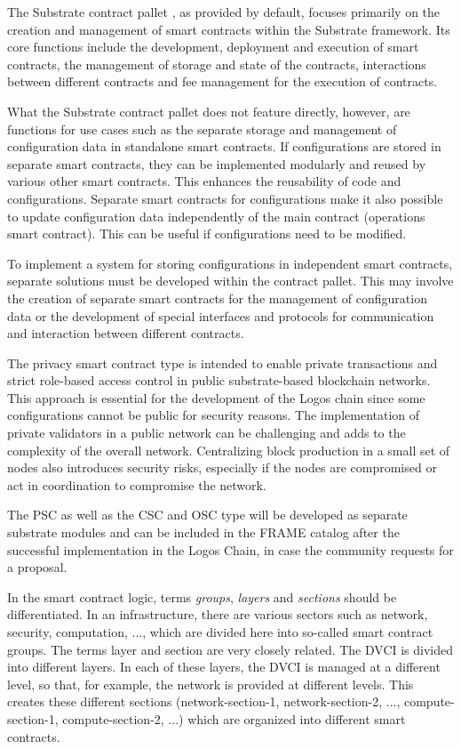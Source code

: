 \documentclass[]{article}
\begin{document}
The Substrate contract pallet \cite{Parity-docs-npos}, as provided by default, focuses primarily on the creation and management of smart contracts within the Substrate framework. 
Its core functions include the development, deployment and execution of smart contracts, the management of storage and state of the contracts, interactions between different contracts and fee management for the execution of contracts. 

What the Substrate contract pallet does not feature directly, however, are functions for use cases such as the separate storage and management of configuration data in standalone smart contracts.
If configurations are stored in separate smart contracts, they can be implemented modularly and reused by various other smart contracts. This enhances the reusability of code and configurations.
Separate smart contracts for configurations make it also possible to update configuration data independently of the main contract (operations smart contract). 
This can be useful if configurations need to be modified.

To implement a system for storing configurations in independent smart contracts, separate solutions must be developed within the contract pallet. 
This may involve the creation of separate smart contracts for the management of configuration data or the development of special interfaces and protocols for communication and interaction between different contracts.

The privacy smart contract type is intended to enable private transactions and strict role-based access control in public substrate-based blockchain networks.
This approach is essential for the development of the Logos chain since some configurations cannot be public for security reasons.
The implementation of private validators in a public network can be challenging and adds to the complexity of the overall network.
Centralizing block production in a small set of nodes also introduces security risks, especially if the nodes are compromised or act in coordination to compromise the network.

The PSC as well as the CSC and OSC type will be developed as separate substrate modules and can be included in the FRAME catalog after the successful implementation in the Logos Chain, in case the community requests for a proposal.  

In the smart contract logic, terms \textit{groups}, \textit{layers} and \textit{sections} should be differentiated.
In an infrastructure, there are various sectors such as network, security, computation, ..., which are divided here into so-called smart contract groups.
The terms layer and section are very closely related. 
The DVCI is divided into different layers. 
In each of these layers, the DVCI is managed at a different level, so that, for example, the network is provided at different levels.
This creates these different sections (network-section-1, network-section-2, ..., compute-section-1, compute-section-2, ...) which are organized into different smart contracts.
\end{document}
